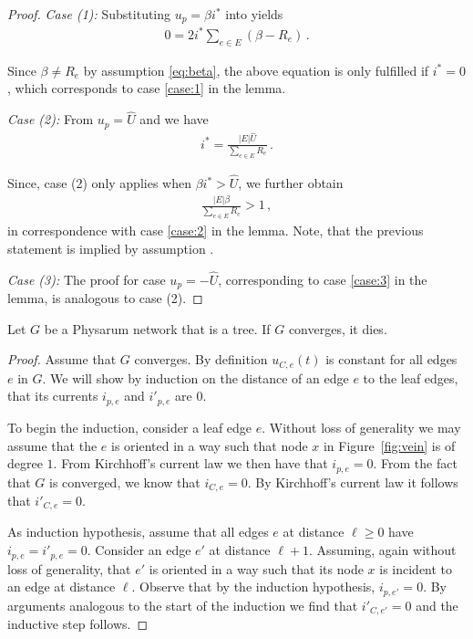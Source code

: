 \begin{proof}
\medskip

\noindent
{\em Case (1):} Substituting $u_p = \beta i^*$ into  yields
\begin{align}
0 = 2 i^*\sum_{e \in E} (\beta - R_e)\,.
\end{align}

Since $\beta \neq R_e$ by assumption \eqref{eq:beta}, the above equation is only fulfilled if $i^* = 0$, which corresponds to case \ref{case:1} in the lemma. 

\medskip
  
\noindent
{\em Case (2):} From $u_p = \hat{U}$ and  we have
\begin{align}
i^* = \frac{|E|\hat{U}}{\sum_{e \in E} R_e}\,.
\end{align}

Since, case (2) only applies when $\beta i^* > \hat{U}$, we further obtain
\begin{align}
\frac{|E|\beta}{\sum_{e \in E} R_e} > 1\,,
\end{align}
in correspondence with case \ref{case:2} in the lemma. Note, that the previous statement is implied by assumption .

\medskip

\noindent
{\em Case (3):} The proof for case $u_p = -\hat{U}$, corresponding to case \ref{case:3} in the lemma, is analogous to case (2). 

\end{proof}


\begin{lem}\label{lem:tree_cont}
Let $G$ be a Physarum network that is a tree. If $G$ converges, it dies.
\end{lem}
\begin{proof}
Assume that $G$ converges.
By definition $u_{C,e}(t)$ is constant for all edges $e$ in $G$. 
We will show by induction on the distance of an edge $e$ to the leaf edges,
  that its currents $i_{p,e}$ and $i'_{p,e}$ are $0$.

To begin the induction, consider a leaf edge $e$.
Without loss of generality we may assume that the $e$ is oriented in a way such that node $x$ in Figure~\ref{fig:vein} is of degree $1$. From Kirchhoff's current law we then have that $i_{p,e} = 0$. From the fact that $G$ is converged, we know that $i_{C,e} = 0$. By Kirchhoff's current law it follows that $i'_{C,e} = 0$.

As induction hypothesis, assume that all edges $e$ at distance $\ell \ge 0$ have $i_{p,e} = i'_{p,e} = 0$.
Consider an edge $e'$ at distance $\ell+1$. Assuming, again without loss of generality, that $e'$ is oriented in a way such that its node $x$ is incident to an edge at distance $\ell$. Observe that by the induction hypothesis, $i_{p,e'} = 0$. By arguments analogous to the start of the induction we find that $i'_{C,e'} = 0$ and the inductive step follows.  
\end{proof}
  
